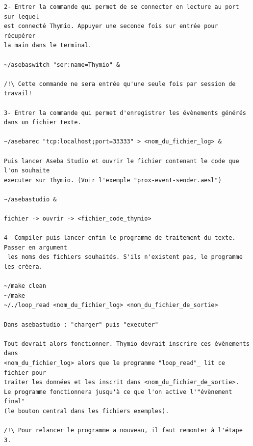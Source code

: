 \documentclass[a4paper, 12pt]{report}
\begin{document}
\begin{verbatim}
2- Entrer la commande qui permet de se connecter en lecture au port sur lequel 
est connecté Thymio. Appuyer une seconde fois sur entrée pour récupérer 
la main dans le terminal.

~/asebaswitch "ser:name=Thymio" &

/!\ Cette commande ne sera entrée qu'une seule fois par session de travail!

3- Entrer la commande qui permet d'enregistrer les évènements générés 
dans un fichier texte.

~/asebarec "tcp:localhost;port=33333" > <nom_du_fichier_log> &

Puis lancer Aseba Studio et ouvrir le fichier contenant le code que l'on souhaite 
executer sur Thymio. (Voir l'exemple "prox-event-sender.aesl")

~/asebastudio &

fichier -> ouvrir -> <fichier_code_thymio>

4- Compiler puis lancer enfin le programme de traitement du texte. Passer en argument
 les noms des fichiers souhaités. S'ils n'existent pas, le programme les créera.

~/make clean
~/make
~/./loop_read <nom_du_fichier_log> <nom_du_fichier_de_sortie>

Dans asebastudio : "charger" puis "executer"

Tout devrait alors fonctionner. Thymio devrait inscrire ces évènements dans 
<nom_du_fichier_log> alors que le programme "loop_read"_ lit ce fichier pour 
traiter les données et les inscrit dans <nom_du_fichier_de_sortie>. 
Le programme fonctionnera jusqu'à ce que l'on active l'"évènement final" 
(le bouton central dans les fichiers exemples).

/!\ Pour relancer le programme a nouveau, il faut remonter à l'étape 3.
\end{verbatim}
\end{document}
